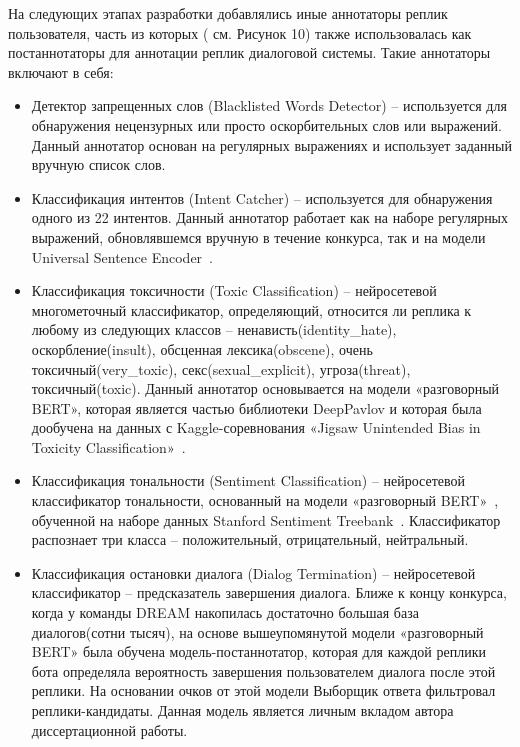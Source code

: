 На следующих этапах разработки добавлялись иные аннотаторы реплик пользователя, часть из которых ( см. Рисунок 10) также использовалась как постаннотаторы для аннотации реплик диалоговой системы. Такие аннотаторы включают в себя:
\begin{itemize}
\item Детектор запрещенных слов (Blacklisted Words Detector) -- используется для обнаружения нецензурных или просто оскорбительных слов или выражений. Данный аннотатор основан на регулярных выражениях и использует заданный вручную список слов.

\item Классификация интентов (Intent Catcher) -- используется для обнаружения одного из 22 интентов. Данный аннотатор работает как на наборе регулярных выражений, обновлявшемся вручную в течение конкурса, так и на модели Universal Sentence Encoder~\cite{cer_2018}.

\item Классификация токсичности (Toxic Classification) -- нейросетевой многометочный классификатор, определяющий, относится ли реплика к любому из следующих классов -- ненависть(identity\_hate), оскорбление(insult), обсценная лексика(obscene), очень токсичный(very\_toxic), секс(sexual\_explicit), угроза(threat), токсичный(toxic). Данный аннотатор основывается на модели «разговорный BERT»\cite{dp_conv_bert}, которая является частью библиотеки DeepPavlov и которая была дообучена на данных с Kaggle-соревнования «Jigsaw Unintended Bias in Toxicity Classification»~\cite{toxic_kaggle}.

\item Классификация тональности (Sentiment Classification) -- нейросетевой классификатор тональности, основанный на модели «разговорный BERT»~\cite{na_website_ndn}, обученной на наборе данных Stanford Sentiment Treebank~\cite{sst}. Классификатор распознает три класса -- положительный, отрицательный, нейтральный.

\item Классификация остановки диалога (Dialog Termination) -- нейросетевой классификатор -- предсказатель завершения диалога. Ближе к концу конкурса, когда у команды {DREAM} накопилась достаточно большая база диалогов(сотни тысяч), на основе вышеупомянутой модели «разговорный BERT» была обучена модель-постаннотатор, которая для каждой реплики бота определяла вероятность завершения пользователем диалога после этой реплики. На основании очков от этой модели Выборщик ответа фильтровал реплики-кандидаты. Данная модель является личным вкладом автора диссертационной работы.


\end{itemize}
